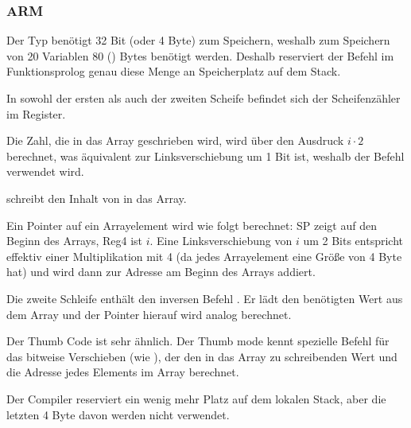 \subsubsection{ARM}

\myparagraph{\NonOptimizingKeilVI (\ARMMode)}



Der Typ \Tint benötigt 32 Bit (oder 4 Byte) zum Speichern, weshalb zum Speichern von 20 \Tint Variablen 80 ()
Bytes benötigt werden. Deshalb reserviert der Befehl  im Funktionsprolog genau diese Menge an
Speicherplatz auf dem Stack.

In sowohl der ersten als auch der zweiten Scheife befindet sich der Scheifenzähler  im  Register.

Die Zahl, die in das Array geschrieben wird, wird über den Ausdruck $i\cdot 2$ berechnet, was äquivalent zur
Linksverschiebung um 1 Bit ist, weshalb der Befehl  verwendet wird.

 schreibt den Inhalt von  in das Array.

Ein Pointer auf ein Arrayelement wird wie folgt berechnet: \ac{SP} zeigt auf den Beginn des Arrays, Reg{4} ist $i$.
Eine Linksverschiebung von $i$ um 2 Bits entspricht effektiv einer Multiplikation mit 4 (da jedes Arrayelement eine
Größe von 4 Byte hat) und wird dann zur Adresse am Beginn des Arrays addiert.

Die zweite Schleife enthält den inversen Befehl . Er lädt den benötigten Wert aus dem Array
und der Pointer hierauf wird analog berechnet.

\myparagraph{\OptimizingKeilVI (\ThumbMode)}



Der Thumb Code ist sehr ähnlich.
Der Thumb mode kennt spezielle Befehl für das bitweise Verschieben (wie ), der den in das Array zu schreibenden
Wert und die Adresse jedes Elements im Array berechnet.

Der Compiler reserviert ein wenig mehr Platz auf dem lokalen Stack, aber die letzten 4 Byte davon werden nicht
verwendet.




